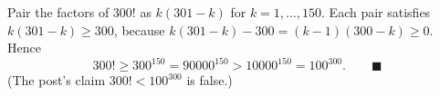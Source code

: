 Pair the factors of $300!$ as $k(301-k)$ for $k=1,\dots,150$. Each pair satisfies $k(301-k)\ge300$, because $k(301-k)-300=(k-1)(300-k)\ge0$. Hence
\[
300!\ge300^{150}=90000^{150}>10000^{150}=100^{300}. \qquad\blacksquare
\]
(The post's claim $300!<100^{300}$ is false.)
